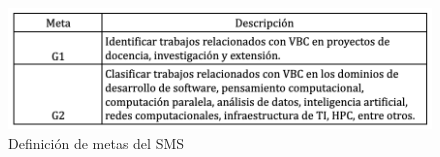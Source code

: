 \begin{figure}[H]
    \centering
    \includegraphics[width=\textwidth] {tablas-images/cp2/definicionMetas.png}
    \caption{Definición de metas del SMS}\label{fig:tabla-metas}
\end{figure}
